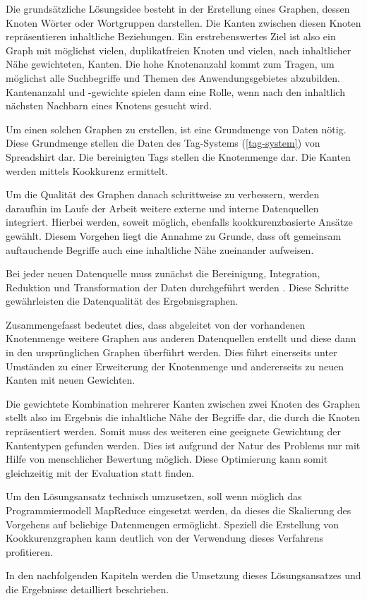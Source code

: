 Die grundsätzliche Lösungsidee besteht in der Erstellung eines Graphen, dessen Knoten Wörter oder Wortgruppen darstellen. Die Kanten zwischen diesen Knoten repräsentieren inhaltliche Beziehungen. Ein erstrebenswertes Ziel ist also ein Graph mit möglichst vielen, duplikatfreien Knoten und vielen, nach inhaltlicher Nähe gewichteten, Kanten. Die hohe Knotenanzahl kommt zum Tragen, um möglichst alle Suchbegriffe und Themen des Anwendungsgebietes abzubilden. Kantenanzahl und -gewichte spielen dann eine Rolle, wenn nach den inhaltlich nächsten Nachbarn eines Knotens gesucht wird.

Um einen solchen Graphen zu erstellen, ist eine Grundmenge von Daten nötig. Diese Grundmenge stellen die Daten des Tag-Systems (\ref{tag-system}) von Spreadshirt dar. Die bereinigten Tags stellen die Knotenmenge dar. Die Kanten werden mittels Kookkurenz ermittelt.

Um die Qualität des Graphen danach schrittweise zu verbessern, werden daraufhin im Laufe der Arbeit weitere externe und interne Datenquellen integriert. Hierbei werden, soweit möglich, ebenfalls kookkurenzbasierte Ansätze gewählt. Diesem Vorgehen liegt die Annahme zu Grunde, dass oft gemeinsam auftauchende Begriffe auch eine inhaltliche Nähe zueinander aufweisen.

Bei jeder neuen Datenquelle muss zunächst die Bereinigung, Integration, Reduktion und Transformation der Daten durchgeführt werden \cite{hkp2012}. Diese Schritte gewährleisten die Datenqualität des Ergebnisgraphen.

Zusammengefasst bedeutet dies, dass abgeleitet von der vorhandenen Knotenmenge weitere Graphen aus anderen Datenquellen erstellt und diese dann in den ursprünglichen Graphen überführt werden. Dies führt einerseits unter Umständen zu einer Erweiterung der Knotenmenge und andererseits zu neuen Kanten mit neuen Gewichten.

Die gewichtete Kombination mehrerer Kanten zwischen zwei Knoten des Graphen stellt also im Ergebnis die inhaltliche Nähe der Begriffe dar, die durch die Knoten repräsentiert werden. Somit muss des weiteren eine geeignete Gewichtung der Kantentypen gefunden werden. Dies ist aufgrund der Natur des Problems nur mit Hilfe von menschlicher Bewertung möglich. Diese Optimierung kann somit gleichzeitig mit der Evaluation statt finden.

Um den Lösungsansatz technisch umzusetzen, soll wenn möglich das Programmiermodell MapReduce \cite{dg2004} eingesetzt werden, da dieses die Skalierung des Vorgehens auf beliebige Datenmengen ermöglicht. Speziell die Erstellung von Kookkurenzgraphen kann deutlich von der Verwendung dieses Verfahrens profitieren.

In den nachfolgenden Kapiteln werden die Umsetzung dieses Lösungsansatzes und die Ergebnisse detailliert beschrieben.